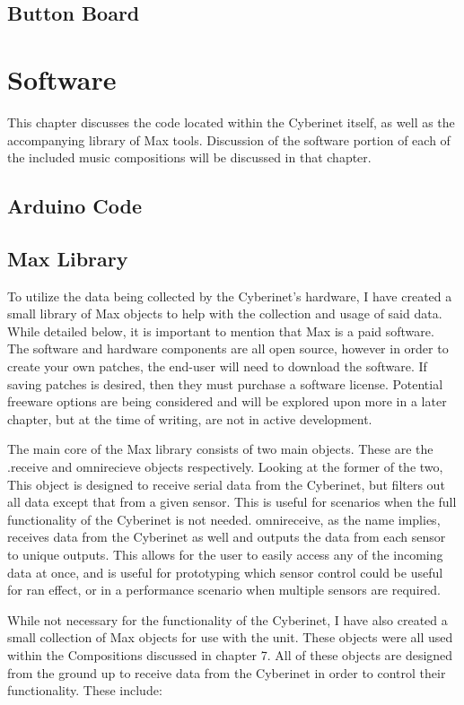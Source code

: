 \section{Button Board}


\chapter{Software}
This chapter discusses the code located within the Cyberinet itself, as well as the accompanying library of Max tools. Discussion of the software portion of each of the included music compositions will be discussed in that chapter. 

\section{Arduino Code}

\section{Max Library}

To utilize the data being collected by the Cyberinet’s hardware, I have created a small library of Max objects to help with the collection and usage of said data. While detailed below, it is important to mention that Max is a paid software. The software and hardware components are all open source, however in order to create your own patches, the end-user will need to download the software. If saving patches is desired, then they must purchase a software license. Potential freeware options are being considered and will be explored upon more in a later chapter, but at the time of writing, are not in active development.

The main core of the Max library consists of two main objects. These are the .receive and omnirecieve objects respectively. Looking at the former of the two, This object is designed to receive serial data from the Cyberinet, but filters out all data except that from a given sensor. This is useful for scenarios when the full functionality of the Cyberinet is not needed. omnireceive, as the name implies, receives data from the Cyberinet as well and outputs the data from each sensor to unique outputs. This allows for the user to easily access any of the incoming data at once, and is useful for prototyping which sensor control could be useful for ran effect, or in a performance scenario when multiple sensors are required.

While not necessary for the functionality of the Cyberinet, I have also created a small collection of Max objects for use with the unit. These objects were all used within the Compositions discussed in chapter 7. All of these objects are designed from the ground up to receive data from the Cyberinet in order to control their functionality. These include:

